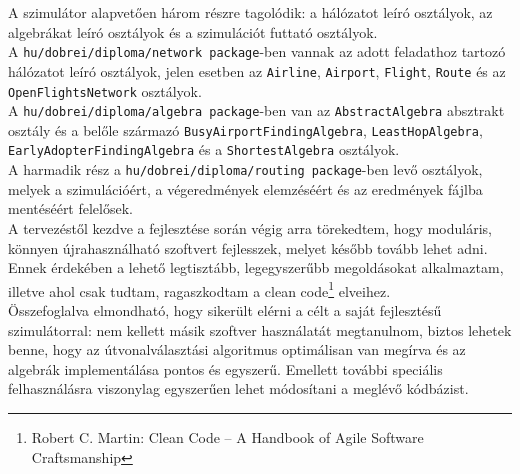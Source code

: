   A szimulátor alapvetően három részre tagolódik: a hálózatot leíró osztályok, az algebrákat leíró osztályok és a szimulációt futtató osztályok.\\

  A \texttt{hu/dobrei/diploma/network package}-ben vannak az adott feladathoz tartozó hálózatot leíró osztályok, jelen esetben az \texttt{Airline}, \texttt{Airport}, \texttt{Flight}, \texttt{Route} és az \texttt{OpenFlightsNetwork} osztályok.\\

  A \texttt{hu/dobrei/diploma/algebra package}-ben van az \texttt{AbstractAlgebra} absztrakt osztály és a belőle származó \texttt{BusyAirportFindingAlgebra}, \texttt{LeastHopAlgebra}, \texttt{EarlyAdopterFindingAlgebra} és a \texttt{ShortestAlgebra} osztályok.\\

  A harmadik rész a \texttt{hu/dobrei/diploma/routing package}-ben levő osztályok, melyek a szimulációért, a végeredmények elemzéséért és az eredmények fájlba mentéséért felelősek.\\

  A tervezéstől kezdve a fejlesztése során végig arra törekedtem, hogy moduláris, könnyen újrahasználható szoftvert fejlesszek, melyet később tovább lehet adni. Ennek érdekében a lehető legtisztább, legegyszerűbb megoldásokat alkalmaztam, illetve ahol csak tudtam, ragaszkodtam a clean code\footnote{Robert C. Martin: Clean Code -- A Handbook of Agile Software Craftsmanship} elveihez.\\

  Összefoglalva elmondható, hogy sikerült elérni a célt a saját fejlesztésű szimulátorral: nem kellett másik szoftver használatát megtanulnom, biztos lehetek benne, hogy az útvonalválasztási algoritmus optimálisan van megírva és az algebrák implementálása pontos és egyszerű. Emellett további speciális felhasználásra viszonylag egyszerűen lehet módosítani a meglévő kódbázist.
